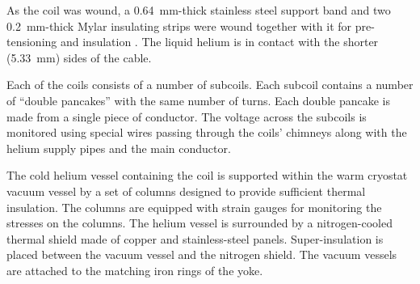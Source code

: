 As the coil was wound, a 0.64~mm-thick stainless steel support band
and two 0.2~mm-thick Mylar insulating strips were wound together with it
for pre-tensioning and insulation%
. 
The liquid helium is in contact with the shorter (5.33~mm) sides of
the cable.

Each of the coils consists of a number of subcoils. Each subcoil
contains a number of ``double pancakes'' with the same number of
turns.
Each double pancake is made from a single piece of conductor. The
voltage across the subcoils is monitored using special wires passing
through the coils' chimneys along with the helium supply pipes and the
main conductor.

The cold helium vessel containing the coil is supported within the
warm cryostat vacuum vessel by a set of columns designed to provide
sufficient thermal insulation. The columns are equipped with strain
gauges for monitoring the stresses on the columns. The helium vessel
is surrounded by a nitrogen-cooled thermal shield made of copper and stainless-steel panels.
Super-insulation is placed between the vacuum vessel and the nitrogen
shield.  The vacuum vessels are attached to the matching iron rings of
the yoke.

